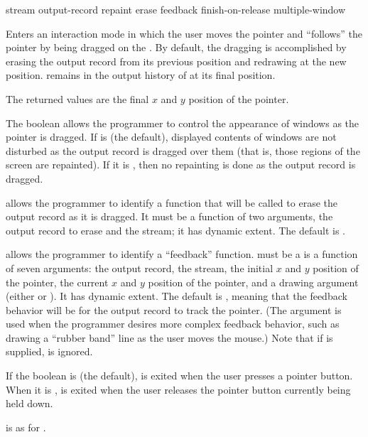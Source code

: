  {stream output-record
                                  \key repaint erase feedback finish-on-release
                                       multiple-window}

Enters an interaction mode in which the user moves the pointer and
 ``follows'' the pointer by being dragged on the  .  By default, the dragging is accomplished by
erasing the output record from its previous position and redrawing at the new
position.   remains in the output history of  at
its final position.

The returned values are the final $x$ and $y$ position of the pointer.

The boolean  allows the programmer to control the appearance of
windows as the pointer is dragged.  If  is  (the
default), displayed contents of windows are not disturbed as the output record
is dragged over them (that is, those regions of the screen are repainted).  If
it is , then no repainting is done as the output record is dragged.

 allows the programmer to identify a function that will be called to
erase the output record as it is dragged.  It must be a function of two
arguments, the output record to erase and the stream; it has dynamic extent.
The default is .

 allows the programmer to identify a ``feedback'' function.
 must be a is a function of seven arguments: the output record,
the stream, the initial $x$ and $y$ position of the pointer, the current $x$ and
$y$ position of the pointer, and a drawing argument (either  or
).  It has dynamic extent.  The default is , meaning that the
feedback behavior will be for the output record to track the pointer.  (The
 argument is used when the programmer desires more complex
feedback behavior, such as drawing a ``rubber band'' line as the user moves the
mouse.)  Note that if  is supplied,  is ignored.

If the boolean  is  (the default),
 is exited when the user presses a pointer button.  When
it is ,  is exited when the user releases the
pointer button currently being held down.

 is as for .


